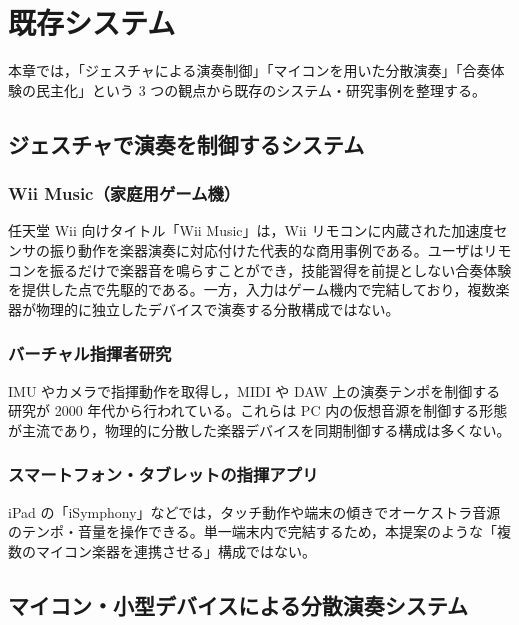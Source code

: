 \chapter{既存システム}
\label{ch:existing_systems}

本章では，「ジェスチャによる演奏制御」「マイコンを用いた分散演奏」「合奏体験の民主化」という 3 つの観点から既存のシステム・研究事例を整理する。

\section{ジェスチャで演奏を制御するシステム}

\subsection{Wii Music（家庭用ゲーム機）}

任天堂 Wii 向けタイトル「Wii Music」は，Wii リモコンに内蔵された加速度センサの振り動作を楽器演奏に対応付けた代表的な商用事例である\cite{nintendo_wiimusic}。ユーザはリモコンを振るだけで楽器音を鳴らすことができ，技能習得を前提としない合奏体験を提供した点で先駆的である。一方，入力はゲーム機内で完結しており，複数楽器が物理的に独立したデバイスで演奏する分散構成ではない。

\subsection{バーチャル指揮者研究}

IMU やカメラで指揮動作を取得し，MIDI や DAW 上の演奏テンポを制御する研究が 2000 年代から行われている\cite{virtual_conductor}。これらは PC 内の仮想音源を制御する形態が主流であり，物理的に分散した楽器デバイスを同期制御する構成は多くない。

\subsection{スマートフォン・タブレットの指揮アプリ}

iPad の「iSymphony」などでは，タッチ動作や端末の傾きでオーケストラ音源のテンポ・音量を操作できる\cite{isymphony}。単一端末内で完結するため，本提案のような「複数のマイコン楽器を連携させる」構成ではない。

\section{マイコン・小型デバイスによる分散演奏システム}

